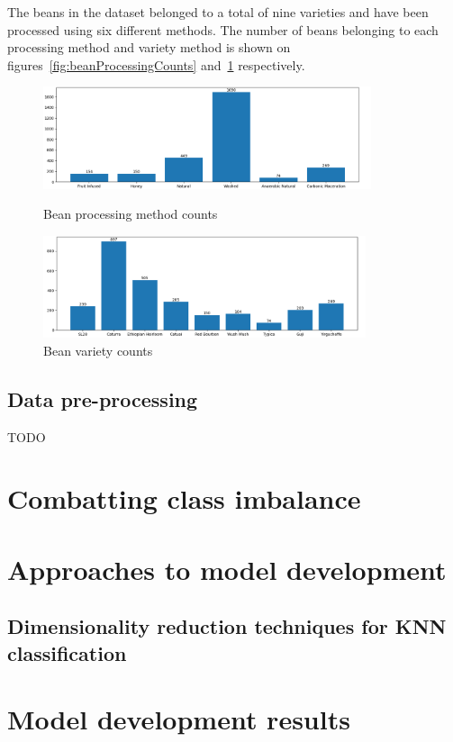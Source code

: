 The beans in the dataset belonged to a total of nine varieties and have been processed using six different methods.
The number of beans belonging to each processing method and variety method is shown
on figures~\ref{fig:beanProcessingCounts} and~\ref{fig:beanVarietyCounts} respectively.
\begin{figure}[h]
	\centering
		\includegraphics[width=\linewidth, height=3cm]{
			./figures/methodology/processing-counts
		}
	\caption{Bean processing method counts}
	\label{fig:beanProcessingCounts}

	\includegraphics[width=\linewidth, height=3cm]{
			./figures/methodology/variety-counts
		}
	\caption{Bean variety counts}
	\label{fig:beanVarietyCounts}
\end{figure}

\subsection{Data pre-processing}
\label{subsec:data-pre-processing}
TODO \cite{opencvLibrary}
\section{Combatting class imbalance}
\label{sec:combatting-class-imbalance}

\section{Approaches to model development}
\label{sec:approaches-to-model-development}
\subsection{Dimensionality reduction techniques for KNN classification}
\label{subsec:dimensionality-reduction-techniques-for-knn-classification}

\section{Model development results}
\label{sec:model-development-results}